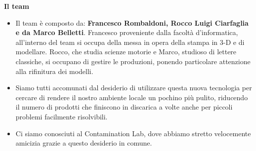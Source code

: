 \documentclass[hidelinks,aspectratio=169]{beamer}
\begin{document}
	\begin{frame}{\textbf{Il team}}
		\begin{itemize}
		
		\item Il team è composto da: \textbf{Francesco Rombaldoni, Rocco Luigi Ciarfaglia e da Marco Belletti}. \newline
		Francesco proveniente dalla facoltà d'informatica, all'interno del team si occupa della messa in opera della stampa in 3-D e di modellare. Rocco, che studia scienze motorie e Marco, studioso di lettere classiche, si occupano di gestire le produzioni, ponendo particolare attenzione alla rifinitura dei modelli. 
		\item Siamo tutti accomunati dal desiderio di utilizzare questa nuova tecnologia per cercare di rendere il nostro ambiente locale un pochino più pulito, riducendo il numero di prodotti che finiscono in discarica a volte anche per piccoli problemi facilmente risolvibili.
		\item Ci siamo conosciuti al Contamination Lab, dove abbiamo stretto velocemente amicizia grazie a questo desiderio in comune. 
			
		\end{itemize}
	\end{frame}
\end{document}
